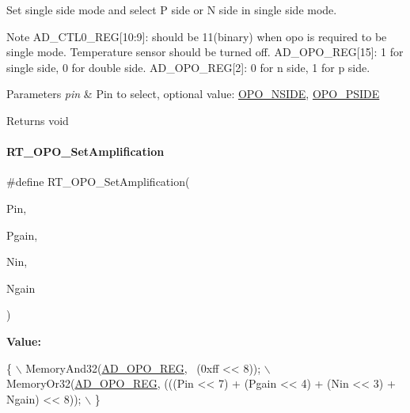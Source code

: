 Set single side mode and select P side or N side in single side mode. 

\begin{DoxyNote}{Note}
A\+D\+\_\+\+C\+T\+L0\+\_\+\+R\+EG\mbox{[}10\+:9\mbox{]}\+: should be 11(binary) when opo is required to be single mode. Temperature sensor should be turned off. A\+D\+\_\+\+O\+P\+O\+\_\+\+R\+EG\mbox{[}15\mbox{]}\+: 1 for single side, 0 for double side. A\+D\+\_\+\+O\+P\+O\+\_\+\+R\+EG\mbox{[}2\mbox{]}\+: 0 for n side, 1 for p side. 
\end{DoxyNote}

\begin{DoxyParams}{Parameters}
{\em pin} & Pin to select, optional value\+: \mbox{\hyperlink{a00002_afb2207320139ac264d5cc1600d3cae9eafd1c5b2cbd5e5a8866364e6af2dbd4c0}{O\+P\+O\+\_\+\+N\+S\+I\+DE}}, \mbox{\hyperlink{a00002_afb2207320139ac264d5cc1600d3cae9ea740f1053bc0489a53c4cfe9bfc3de403}{O\+P\+O\+\_\+\+P\+S\+I\+DE}} \\
\hline
\end{DoxyParams}
\begin{DoxyReturn}{Returns}
void 
\end{DoxyReturn}
\mbox{\label{a00002_ab2a6c21c91c7f05f3de9fefbd30ff95b}} 
\paragraph{\texorpdfstring{R\+T\+\_\+\+O\+P\+O\+\_\+\+Set\+Amplification}{RT\_OPO\_SetAmplification}}
{\footnotesize\ttfamily \#define R\+T\+\_\+\+O\+P\+O\+\_\+\+Set\+Amplification(\begin{DoxyParamCaption}\item[{}]{Pin,  }\item[{}]{Pgain,  }\item[{}]{Nin,  }\item[{}]{Ngain }\end{DoxyParamCaption})}

{\bfseries Value\+:}
\begin{DoxyCode}
\{                                                                                    \(\backslash\)
        MemoryAnd32(\mbox{\hyperlink{a00020_adadaa0ab1ebbd7ba9b70dfd24c3ed44da6dc7e2b1252e5ac208ae78d9c46e8e7e}{AD\_OPO\_REG}}, ~(0xff << 8));                                           \(\backslash\)
        MemoryOr32(\mbox{\hyperlink{a00020_adadaa0ab1ebbd7ba9b70dfd24c3ed44da6dc7e2b1252e5ac208ae78d9c46e8e7e}{AD\_OPO\_REG}}, (((Pin << 7) + (Pgain << 4) + (Nin << 3) + Ngain) << 8)); \(\backslash\)
    \}
\end{DoxyCode}


